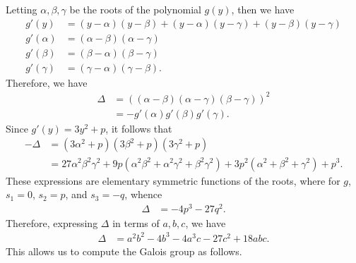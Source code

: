 \documentclass[10pt]{mypackage}
\begin{document}
Letting $\alpha,\beta,\gamma$ be the roots of the polynomial $g(y)$, then we have
\begin{align*}
  g'(y) &= \left( y-\alpha \right)\left( y-\beta \right) + \left( y-\alpha \right)\left( y-\gamma \right) + \left( y-\beta \right)\left( y-\gamma \right)\\
  g'(\alpha) &= \left( \alpha-\beta \right)\left( \alpha-\gamma \right)\\
  g'\left( \beta \right) &= \left( \beta-\alpha \right)\left( \beta-\gamma \right)\\
  g'\left( \gamma \right) &= \left( \gamma-\alpha \right)\left( \gamma-\beta \right).
\end{align*}
Therefore, we have
\begin{align*}
  \Delta &= \left( \left( \alpha-\beta \right)\left( \alpha-\gamma \right)\left( \beta-\gamma \right) \right)^2\\
         &= -g'\left( \alpha \right)g'\left( \beta \right)g'\left( \gamma \right).
\end{align*}
Since $g'(y) = 3y^2 + p$, it follows that
\begin{align*}
  -\Delta &= \left( 3\alpha^2 + p \right)\left( 3\beta^2 + p \right)\left( 3\gamma^2 + p \right)\\
          &= 27\alpha^2\beta^2\gamma^2 + 9p\left( \alpha^2\beta^2 + \alpha^2\gamma^2 + \beta^2\gamma^2 \right) + 3p^2 \left( \alpha^2 + \beta^2 + \gamma^2 \right) + p^3.
\end{align*}
These expressions are elementary symmetric functions of the roots, where for $g$, $s_1 = 0$, $s_2 = p$, and $s_3 = -q$, whence
\begin{align*}
  \Delta &= -4p^3-27q^2.
\end{align*}
Therefore, expressing $\Delta$ in terms of $a,b,c$, we have
\begin{align*}
  \Delta &= a^2b^2 - 4b^3 - 4a^3c - 27c^2 + 18abc.
\end{align*}
This allows us to compute the Galois group as follows.
\end{document}
